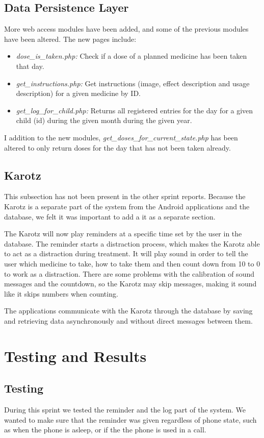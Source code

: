 \subsection{Data Persistence Layer}
More web access modules have been added, and some of the previous modules have been altered. The new pages include:
\begin{itemize}
  \item \emph{dose\_is\_taken.php:} Check if a dose of a planned medicine has been taken that day.
  \item \emph{get\_instructions.php:} Get instructions (image, effect description and usage description) for a given medicine by ID.
  \item \emph{get\_log\_for\_child.php:} Returns all registered entries for the day for a given child (id) during the given month during the given year.
\end{itemize}
I addition to the new modules, \emph{get\_doses\_for\_current\_state.php} has been altered to only return doses for the day that has not been taken already.

\subsection{Karotz}
This subsection has not been present in the other sprint reports. Because the Karotz is a 
separate part of the system from the Android applications and the database, we felt
it was important to add a it as a separate section.

The Karotz will now play reminders at a specific time set by the user in the database. The
reminder starts a distraction process, which makes the Karotz able to act as a distraction 
during treatment. It will play sound in order to tell the user which medicine to take, 
how to take them and then count down from 10 to 0 to work as a distraction. There are some 
problems with the calibration of sound messages and the countdown, so the Karotz may skip 
messages, making it sound like it skips numbers when counting.

The applications communicate with the Karotz through the database by saving and retrieving 
data asynchronously and without direct messages between them.

\section{Testing and Results}
\label{sec:sprint3testingAndResults}

\subsection{Testing}
During this sprint we tested the reminder and the log part of the system. We wanted
to make sure that the reminder was given regardless of phone state, such as when the phone is asleep, or if the the phone
is used in a call. 

